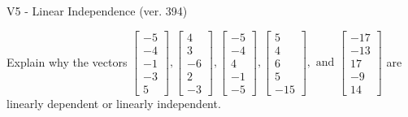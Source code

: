 \begin{exercise}
  \begin{exerciseTitle}V5 - Linear Independence (ver. 394)\end{exerciseTitle}
  \begin{exerciseStatement}
    Explain why the vectors \(\left[\begin{array}{r}
-5 \\
-4 \\
-1 \\
-3 \\
5
\end{array}\right] , \left[\begin{array}{r}
4 \\
3 \\
-6 \\
2 \\
-3
\end{array}\right] , \left[\begin{array}{r}
-5 \\
-4 \\
4 \\
-1 \\
-5
\end{array}\right] , \left[\begin{array}{r}
5 \\
4 \\
6 \\
5 \\
-15
\end{array}\right] , \text{ and } \left[\begin{array}{r}
-17 \\
-13 \\
17 \\
-9 \\
14
\end{array}\right]\) are linearly dependent or linearly independent.	



\end{exerciseStatement}
\end{exercise}
